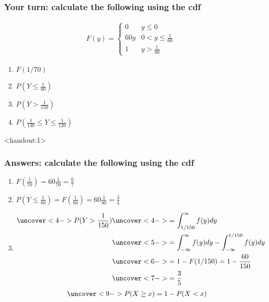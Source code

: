 \documentclass[handout]{beamer}\usepackage{graphicx, color}
\newcommand{\answers}{1}
\numberwithin{equation}{section}
\begin{document}
\begin{frame}
\frametitle{Your turn: calculate the following using the cdf}

\begin{align*}
F(y) = \begin{cases}
0 & y \le 0 \\
60y & 0 < y \le \frac{1}{60} \\
1 & y > \frac{1}{60}
\end{cases}
\end{align*}

\begin{enumerate}[1. ]
\item $F({1/70})$
\item $P(Y \le \frac{1}{80})$
\item $P(Y > \frac{1}{150})$
\item $P(\frac{1}{130} \le Y  \le \frac{1}{120})$
\end{enumerate}
\end{frame}






\begin{frame}<handout:\answers>
\frametitle{Answers: calculate the following using the cdf}
\begin{enumerate}[1. ]
\pause \item $F(\frac{1}{70}) = 60 \frac{1}{70} = \frac{6}{7}$
\pause \item $P(Y \le \frac{1}{80}) = F(\frac{1}{80}) = 60 \frac{1}{80} = \frac{3}{4}$
\item \begin{align*}
\uncover<4->{P(Y > \frac{1}{150})} & \uncover<4->{= \int_{1/150}^\infty f(y) dy} \\
& \uncover<5->{= \int_{-\infty}^\infty f(y) dy - \int_{-\infty}^{1/150} f(y)dy} \\
& \uncover<6->{= 1 - F(1/150) = 1 - \frac{60}{150}} \\
& \uncover<7->{= \frac{3}{5}}
\end{align*}
\begin{align*}
\uncover<9->{P(X \ge x) = 1 - P(X < x)}
\end{align*}
\end{enumerate}
\end{frame}
\end{document}
